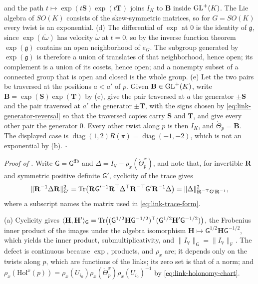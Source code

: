 and the path $t\mapsto\exp(t\mathbf S)\exp(t\mathbf T)$ joins $I_K$ to $\mathbf B$ inside $\mathrm{GL}^+(K)$.
The Lie algebra of $SO(K)$ consists of the skew-symmetric matrices, so for $G=SO(K)$ every twist is an
exponential.
(d) The differential of $\exp$ at $0$ is the identity of $\mathfrak g$, since $\exp(t\mathring\omega)$
has velocity $\mathring\omega$ at $t=0$, so by the inverse function theorem $\exp(\mathfrak g)$
contains an open neighborhood of $e_G$. The subgroup generated by $\exp(\mathfrak g)$ is therefore a
union of translates of that neighborhood, hence open; its complement is a union of its cosets, hence
open; and a nonempty subset of a connected group that is open and closed is the whole group.
(e) Let the two pairs be traversed at the positions $a<a'$ of $p$. Given $\mathbf B\in\mathrm{GL}^+(K)$, write
$\mathbf B=\exp(\mathbf S)\exp(\mathbf T)$ by (c), give the pair traversed at $a$ the generator
$\pm\mathbf S$ and the pair traversed at $a'$ the generator $\pm\mathbf T$, with the signs chosen by
\cref{eq:link-generator-reversal} so that the traversed copies carry $\mathbf S$ and $\mathbf T$, and give
every other pair the generator $0$. Every other twist along $p$ is then $I_K$, and
$\mathring\Theta_p=\mathbf B$. The displayed case is
$\operatorname{diag}(1,2)R(\pi)=\operatorname{diag}(-1,-2)$, which is not an exponential by (b).
\hfill$\square$

\noindent\emph{Proof of .}
Write $\mathsf G=\mathsf G^{\mathrm{fib}}$ and $\Delta=I_{\mathbb V}-\rho_x(\mathring\Theta^x_p)$, and
note that, for invertible $\mathbf R$ and symmetric positive definite $\mathsf G'$, cyclicity of the trace
gives
\begin{equation}
\lVert\mathbf R^{-1}\Delta\mathbf R\rVert^2_{\mathsf G'}
=\operatorname{Tr}\bigl(\mathbf R\mathsf G'^{-1}\mathbf R^\top\Delta^\top\mathbf R^{-\top}\mathsf G'\mathbf R^{-1}\Delta\bigr)
=\lVert\Delta\rVert^2_{\mathbf R^{-\top}\mathsf G'\mathbf R^{-1}},
\label{eq:link-defect-conjugation}
\end{equation}
where a subscript names the matrix used in \cref{eq:link-trace-form}.

(a) Cyclicity gives
$\langle\mathbf H,\mathbf H'\rangle_{\mathsf G}=\operatorname{Tr}\bigl((\mathsf G^{1/2}\mathbf H\mathsf G^{-1/2})^\top(\mathsf G^{1/2}\mathbf H'\mathsf G^{-1/2})\bigr)$,
the Frobenius inner product of the images under the algebra isomorphism
$\mathbf H\mapsto\mathsf G^{1/2}\mathbf H\mathsf G^{-1/2}$, which yields the inner product,
submultiplicativity, and $\lVert I_{\mathbb V}\rVert_{\mathsf G}=\lVert I_{\mathbb V}\rVert_{\mathrm F}$. The
defect is continuous because $\exp$, products, and $\rho_x$ are; it depends only on the twists along
$p$, which are functions of the links; its zero set is that of a norm; and
$\rho_x(\mathrm{Hol}^x(p))=\rho_x(U_{i_0})\rho_x(\mathring\Theta^x_p)\rho_x(U_{i_0})^{-1}$ by
\cref{eq:link-holonomy-chart}.

